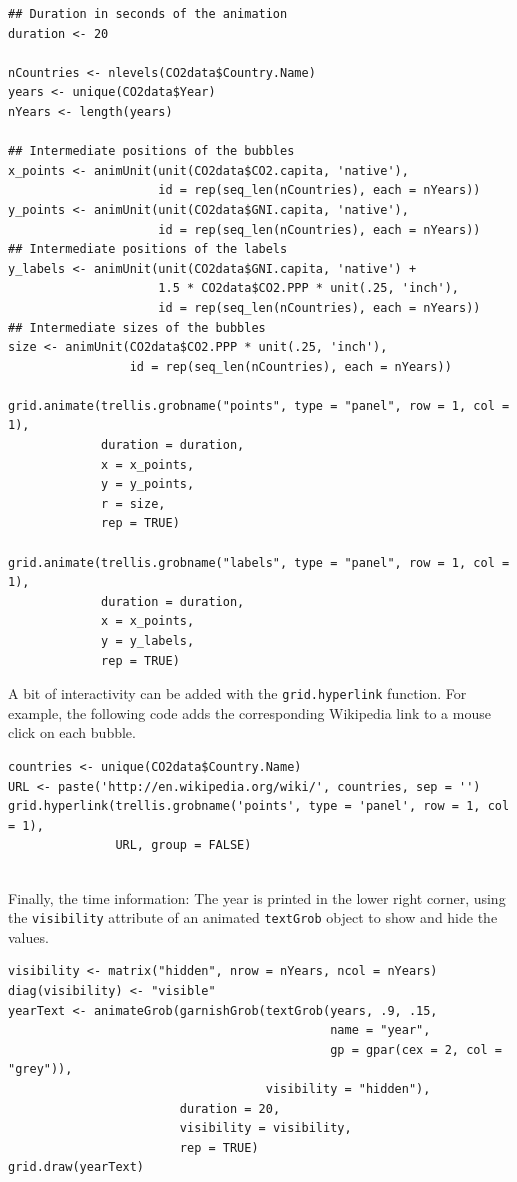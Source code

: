 \documentclass[smallroyalvopaper]{memoir}
\begin{document}
\lstset{language=r,label= ,caption= ,captionpos=b,numbers=none}
\begin{lstlisting}
## Duration in seconds of the animation
duration <- 20
  
nCountries <- nlevels(CO2data$Country.Name)
years <- unique(CO2data$Year)
nYears <- length(years)

## Intermediate positions of the bubbles
x_points <- animUnit(unit(CO2data$CO2.capita, 'native'),
                     id = rep(seq_len(nCountries), each = nYears))
y_points <- animUnit(unit(CO2data$GNI.capita, 'native'),
                     id = rep(seq_len(nCountries), each = nYears))
## Intermediate positions of the labels
y_labels <- animUnit(unit(CO2data$GNI.capita, 'native') +
                     1.5 * CO2data$CO2.PPP * unit(.25, 'inch'),
                     id = rep(seq_len(nCountries), each = nYears))
## Intermediate sizes of the bubbles
size <- animUnit(CO2data$CO2.PPP * unit(.25, 'inch'),
                 id = rep(seq_len(nCountries), each = nYears))

grid.animate(trellis.grobname("points", type = "panel", row = 1, col = 1),
             duration = duration,
             x = x_points,
             y = y_points,
             r = size,
             rep = TRUE)

grid.animate(trellis.grobname("labels", type = "panel", row = 1, col = 1),
             duration = duration,
             x = x_points,
             y = y_labels,
             rep = TRUE)

\end{lstlisting}

A bit of interactivity can be added with the \texttt{grid.hyperlink}
function. For example, the following code adds the corresponding
Wikipedia link to a mouse click on each bubble.


\lstset{language=r,label= ,caption= ,captionpos=b,numbers=none}
\begin{lstlisting}
countries <- unique(CO2data$Country.Name)
URL <- paste('http://en.wikipedia.org/wiki/', countries, sep = '')
grid.hyperlink(trellis.grobname('points', type = 'panel', row = 1, col = 1),
               URL, group = FALSE)
  
\end{lstlisting}

Finally, the time information: The year is printed in the lower
right corner, using the \texttt{visibility} attribute of an animated
\texttt{textGrob} object to show and hide the values.
\lstset{language=r,label= ,caption= ,captionpos=b,numbers=none}
\begin{lstlisting}
visibility <- matrix("hidden", nrow = nYears, ncol = nYears)
diag(visibility) <- "visible"
yearText <- animateGrob(garnishGrob(textGrob(years, .9, .15,
                                             name = "year",
                                             gp = gpar(cex = 2, col = "grey")),
                                    visibility = "hidden"),
                        duration = 20,
                        visibility = visibility,
                        rep = TRUE)
grid.draw(yearText)
\end{lstlisting}
\end{document}
